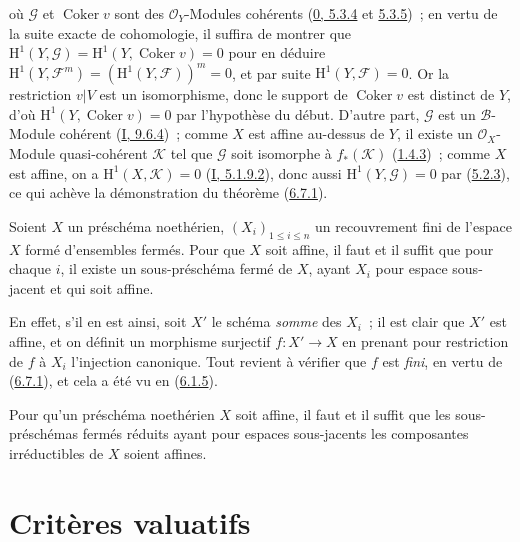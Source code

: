 
où $\mathcal{G}$ et $\operatorname{Coker}v$ sont des
$\mathcal{O}_Y$-Modules cohérents
(\hyperref[0.5.3.4-fr]{0, 5.3.4} et
\hyperref[0.5.3.5-fr]{5.3.5})~; en vertu de la suite exacte de cohomologie,
il suffira de montrer que
$\mathrm{H}^1(Y,\mathcal{G})
=\mathrm{H}^1(Y,\operatorname{Coker}v)=0$ pour en déduire
$\mathrm{H}^1(Y,\mathcal{F}^m)
=(\mathrm{H}^1(Y,\mathcal{F}))^m=0$, et par suite
$\mathrm{H}^1(Y,\mathcal{F})=0$. Or la restriction $v|V$ est un isomorphisme,
donc le support de $\operatorname{Coker}v$ est distinct de $Y$, d'où
$\mathrm{H}^1(Y,\operatorname{Coker}v)=0$ par l'hypothèse du début. D'autre
part, $\mathcal{G}$ est un $\mathcal{B}$-Module cohérent
(\hyperref[I.9.6.4-fr]{I, 9.6.4})~; comme $X$ est affine au-dessus de $Y$, il
existe un $\mathcal{O}_X$-Module quasi-cohérent $\mathcal{K}$ tel que
$\mathcal{G}$ soit isomorphe à $f_*(\mathcal{K})$
(\hyperref[II.1.4.3-fr]{1.4.3})~; comme $X$ est affine, on a
$\mathrm{H}^1(X,\mathcal{K})=0$
(\hyperref[I.5.1.9.2-fr]{I, 5.1.9.2}), donc aussi
$\mathrm{H}^1(Y,\mathcal{G})=0$ par
(\hyperref[II.5.2.3-fr]{5.2.3}), ce qui achève la démonstration du théorème
(\hyperref[II.6.7.1-fr]{6.7.1}).

\begin{corollary}[6.7.2]
\label{II.6.7.2-fr}
Soient $X$ un préschéma noethérien, $(X_i)_{1\leq i\leq n}$ un recouvrement
fini de l'espace $X$ formé d'ensembles fermés. Pour que $X$ soit affine, il
faut et il suffit que pour chaque $i$, il existe un sous-préschéma fermé de
$X$, ayant $X_i$ pour espace sous-jacent et qui soit affine.
\end{corollary}

En effet, s'il en est ainsi, soit $X'$ le schéma \emph{somme} des $X_i$~; il
est clair que $X'$ est affine, et on définit un morphisme surjectif
$f:X'\to X$ en prenant pour restriction de $f$ à $X_i$ l'injection
canonique. Tout revient à vérifier que $f$ est \emph{fini}, en vertu de
(\hyperref[II.6.7.1-fr]{6.7.1}), et cela a été vu en
(\hyperref[II.6.1.5-fr]{6.1.5}).

\begin{corollary}[6.7.3]
\label{II.6.7.3-fr}
Pour qu'un préschéma noethérien $X$ soit affine, il faut et il suffit que les
sous-préschémas fermés réduits ayant pour espaces sous-jacents les composantes
irréductibles de $X$ soient affines.
\end{corollary}

\section{Critères valuatifs}
\label{section:II.7-fr}

